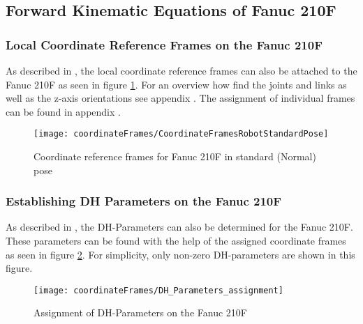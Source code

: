 \subsection{Forward Kinematic Equations of Fanuc 210F}



\subsubsection{Local Coordinate Reference Frames on the Fanuc 210F}

As described in , the local coordinate reference frames can also be attached to the Fanuc 210F as seen in figure \ref{fig:RefFrame}. For an overview how find the joints and links as well as the z-axis orientations see appendix . %
The assignment of individual frames can be found in appendix .\\

\begin{figure}[H]
	\texttt{[image: coordinateFrames/CoordinateFramesRobotStandardPose]}
	\caption{Coordinate reference frames for Fanuc 210F in standard (Normal) pose}
	\label{fig:RefFrame}
\end{figure}






\medskip




\subsubsection{Establishing \ac{DH} Parameters on the Fanuc 210F}

As described in , the \ac{DH}-Parameters can also be determined for the Fanuc 210F.
These parameters can be found with the help of the assigned coordinate frames as seen in figure \ref{fig:DH_Parameters_Fanuc210F}. For simplicity, only non-zero DH-parameters are shown in this figure.

\begin{figure}[h]
	\texttt{[image: coordinateFrames/DH\_Parameters\_assignment]}
	\caption{Assignment of DH-Parameters on the Fanuc 210F}
	\label{fig:DH_Parameters_Fanuc210F}
\end{figure}


